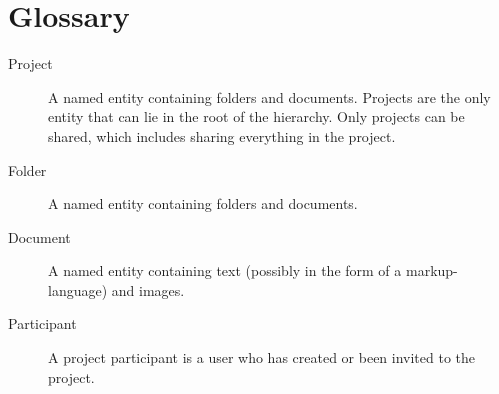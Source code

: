 \section{Glossary}
\label{sec:glossary}

\begin{description}
    \item[Project] A named entity containing folders and documents. Projects are the only entity that
        can lie in the root of the hierarchy. Only projects can be shared, which includes sharing
        everything in the project.
    \item[Folder] A named entity containing folders and documents.
    \item[Document] A named entity containing text (possibly in the form of a markup-language) and images.
    \item[Participant] A project participant is a user who has created or been invited to the project.
\end{description}